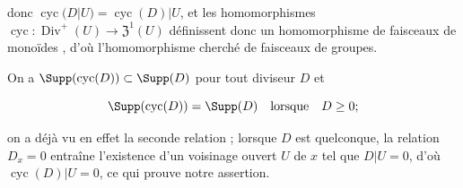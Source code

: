donc $\operatorname{cyc}(D|U)=\operatorname{cyc}(D)|U$, et les homomorphismes $\operatorname{cyc}:\operatorname{Div}^+(U)\to\mathfrak{Z}^1(U)$ définissent donc un homomorphisme de faisceaux de monoïdes , d'où l'homomorphisme cherché  de faisceaux de groupes.

On a $\Supp(\operatorname{cyc}(D))\subset\Supp(D)$ pour tout diviseur $D$ et
\begin{env}[21.6.6.2]
\label{IV.21.6.6.2}
\[
  \Supp(\operatorname{cyc}(D))=\Supp(D)\quad\text{lorsque}\quad D\geq0;
\]
\end{env}
on a déjà vu en effet la seconde relation ;
lorsque $D$ est quelconque, la relation $D_x=0$ entraîne l'existence d'un voisinage ouvert $U$ de $x$ tel que $D|U=0$, d'où $\operatorname{cyc}(D)|U=0$, ce qui prouve notre assertion.

